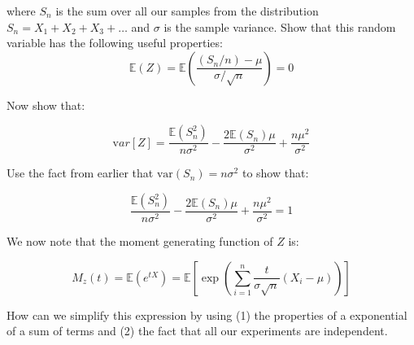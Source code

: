 \documentclass[paper=a4, fontsize=11pt]{scrartcl}
\numberwithin{equation}{section}
\numberwithin{figure}{section}
\numberwithin{table}{section}
\newcommand{\var}[1]{\ensuremath{{\mathrm var}\left[ #1 \right]}}
\begin{document}
\noindent where $S_n$ is the sum over all our samples from the distribution $S_n = X_1 + X_2 + X_3 + \dots$ and $\sigma$ is the sample variance.  Show that this
random variable has the following useful properties:
%
\begin{equation}
 \mathbb{E}(Z) = \mathbb{E}\left( \frac{(S_n/n) - \mu}{\sigma/\sqrt{n}} \right)
= 0
\nonumber
\end{equation}

\vspace{5cm}

%
Now show that: 

\begin{equation}
 \var{Z} = \frac{\mathbb{E}(S_n^2)}{n\sigma^2 } - \frac{2\mathbb{E}(S_n)\mu}{\sigma^2} + \frac{ n\mu^2 }{\sigma^2}
\end{equation}

\vspace{5cm}

%
Use the fact from earlier that $\textrm{var}(S_n)=n\sigma^2$ to show that:

\begin{equation}
 \frac{\mathbb{E}(S_n^2)}{n\sigma^2 } - \frac{2\mathbb{E}(S_n)\mu}{\sigma^2} +
\frac{n\mu^2}{\sigma^2} = 1
\end{equation}

\noindent We now note that the moment generating function of $Z$ is:

\begin{equation}
 M_z(t) = \mathbb{E}(e^{tX}) = \mathbb{E}\left[ \exp\left( \sum_{i=1}^n
\frac{t}{\sigma\sqrt{n}} (X_i-\mu) \right) \right]
\end{equation}

\noindent How can we simplify this expression by using (1) the properties of a
exponential of a sum of terms and (2) the fact that all our experiments are
independent.

\begin{questions}
\vspace{5cm}
\end{questions}
\end{document}
